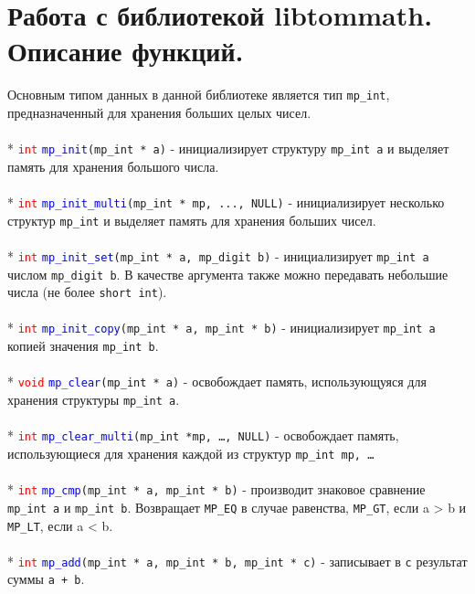 \documentclass[12pt]{article}
\begin{document}
\section{Работа с библиотекой libtommath. Описание функций.}
Основным типом данных в данной библиотеке является тип \texttt{mp\_int}, предназначенный для хранения больших целых чисел.\\
\\*
\textcolor{red}{\texttt{int}} \textcolor{blue}{\texttt{mp\_init}}\texttt{(mp\_int * a)} - инициализирует структуру \texttt{mp\_int а} и выделяет память для хранения большого числа.\\
\\*
\textcolor{red}{\texttt{int}} \textcolor{blue}{\texttt{mp\_init\_multi}}\texttt{(mp\_int * mp, ..., NULL)} - инициализирует несколько структур \texttt{mp\_int} и выделяет память для хранения больших чисел. \\
\\*
\textcolor{red}{\texttt{int}} \textcolor{blue}{\texttt{mp\_init\_set}}\texttt{(mp\_int * a, mp\_digit b)} - инициализирует \texttt{mp\_int a} числом \texttt{mp\_digit b}. В качестве аргумента также можно передавать небольшие числа (не более \texttt{short int}).\\
\\*
\textcolor{red}{\texttt{int}} \textcolor{blue}{\texttt{mp\_init\_copy}}\texttt{(mp\_int * a, mp\_int * b)} - инициализирует \texttt{mp\_int a} копией значения \texttt{mp\_int b}.\\
\\*
\textcolor{red}{\texttt{void}} \textcolor{blue}{\texttt{mp\_clear}}\texttt{(mp\_int * a)} - освобождает память, использующуяся для хранения структуры \texttt{mp\_int a}.\\
\\*
\textcolor{red}{\texttt{int}} \textcolor{blue}{\texttt{mp\_clear\_multi}}\texttt{(mp\_int *mp, \dots, NULL)} - освобождает память, использующиеся для хранения каждой из структур \texttt{mp\_int mp, \dots}\\
\\*
\textcolor{red}{\texttt{int}} \textcolor{blue}{\texttt{mp\_cmp}}\texttt{(mp\_int * a, mp\_int * b)} - производит знаковое сравнение \texttt{mp\_int a} и \texttt{mp\_int b}. Возвращает \texttt{MP\_EQ} в случае равенства, \texttt{MP\_GT}, если a > b и \texttt{MP\_LT}, если a < b. \\
\\*
\textcolor{red}{\texttt{int}} \textcolor{blue}{\texttt{mp\_add}}\texttt{(mp\_int * a, mp\_int * b, mp\_int * c)} - записывает в \texttt{c} результат суммы \texttt{a + b}.\\
\end{document}
